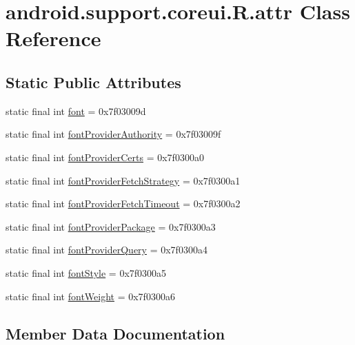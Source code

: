 \hypertarget{classandroid_1_1support_1_1coreui_1_1R_1_1attr}{}\section{android.\+support.\+coreui.\+R.\+attr Class Reference}
\label{classandroid_1_1support_1_1coreui_1_1R_1_1attr}
\subsection*{Static Public Attributes}
\begin{DoxyCompactItemize}
\item 
static final int \mbox{\hyperlink{classandroid_1_1support_1_1coreui_1_1R_1_1attr_a17d3b3e43f708f5cba0b50b65059c375}{font}} = 0x7f03009d
\item 
static final int \mbox{\hyperlink{classandroid_1_1support_1_1coreui_1_1R_1_1attr_a9fd5f26423a65b46a272fd0d2bb91e53}{font\+Provider\+Authority}} = 0x7f03009f
\item 
static final int \mbox{\hyperlink{classandroid_1_1support_1_1coreui_1_1R_1_1attr_a5d49fe6f6e9578576d5241c062913e1d}{font\+Provider\+Certs}} = 0x7f0300a0
\item 
static final int \mbox{\hyperlink{classandroid_1_1support_1_1coreui_1_1R_1_1attr_a337ee19b0e0f16ca5a87467a7b48827d}{font\+Provider\+Fetch\+Strategy}} = 0x7f0300a1
\item 
static final int \mbox{\hyperlink{classandroid_1_1support_1_1coreui_1_1R_1_1attr_a353dac965e46e81a4311964b7d8fb51e}{font\+Provider\+Fetch\+Timeout}} = 0x7f0300a2
\item 
static final int \mbox{\hyperlink{classandroid_1_1support_1_1coreui_1_1R_1_1attr_a89d7a9c88c6e7d6bb844d2997276784f}{font\+Provider\+Package}} = 0x7f0300a3
\item 
static final int \mbox{\hyperlink{classandroid_1_1support_1_1coreui_1_1R_1_1attr_a808f9c9af3114d7422760853d59f9e8a}{font\+Provider\+Query}} = 0x7f0300a4
\item 
static final int \mbox{\hyperlink{classandroid_1_1support_1_1coreui_1_1R_1_1attr_a7b8d9c04303e3b683bdb2c3be641078b}{font\+Style}} = 0x7f0300a5
\item 
static final int \mbox{\hyperlink{classandroid_1_1support_1_1coreui_1_1R_1_1attr_a581f6ee3bb01d0235ac62a192ac890fb}{font\+Weight}} = 0x7f0300a6
\end{DoxyCompactItemize}


\subsection{Member Data Documentation}
\mbox{\label{classandroid_1_1support_1_1coreui_1_1R_1_1attr_a17d3b3e43f708f5cba0b50b65059c375}} 
